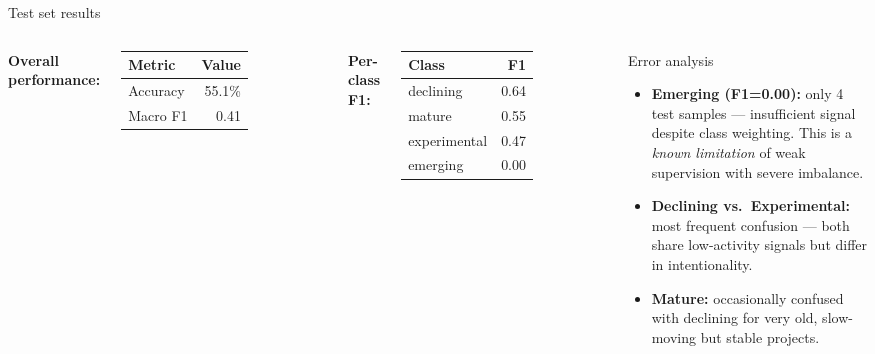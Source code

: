 \begin{frame}{Test set results}

  \begin{columns}
    \textbf{Overall performance:}

    \vspace{0.5em}
    \begin{tabular}{lr}
      \toprule
      Metric & Value \\
      \midrule
      Accuracy & 55.1\% \\
      Macro F1 & 0.41 \\
      \bottomrule
    \end{tabular}

    \vspace{1em}
    \textbf{Per-class F1:}

    \vspace{0.5em}
    \begin{tabular}{lr}
      \toprule
      Class & F1 \\
      \midrule
      \textcolor{declining}{declining} & 0.64 \\
      \textcolor{mature}{mature} & 0.55 \\
      \textcolor{experimental}{experimental} & 0.47 \\
      \textcolor{emerging}{emerging} & 0.00 \\
      \bottomrule
    \end{tabular}

    \begin{redbox}{Error analysis}
      \begin{itemize}
        \item \textbf{Emerging (F1=0.00):} only 4 test samples — insufficient signal despite class weighting. This is a \textit{known limitation} of weak supervision with severe imbalance.
        \item \textbf{Declining vs.\ Experimental:} most frequent confusion — both share low-activity signals but differ in intentionality.
        \item \textbf{Mature:} occasionally confused with declining for very old, slow-moving but stable projects.
      \end{itemize}
    \end{redbox}
  \end{columns}

\end{frame}

